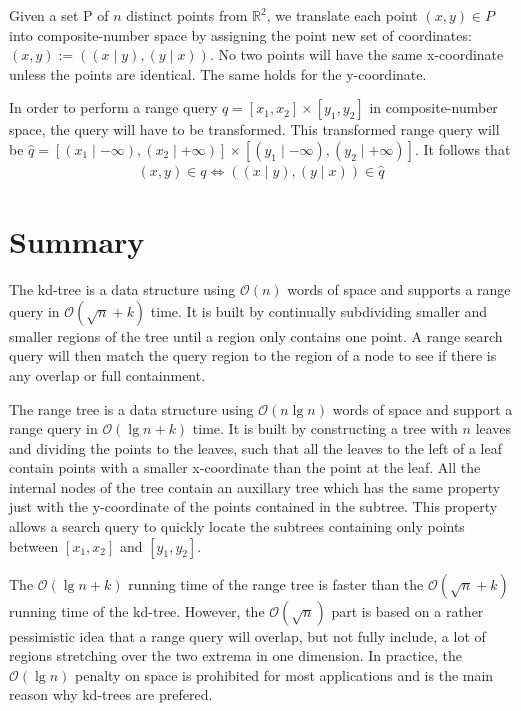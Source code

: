 \noindent Given a set P of $n$ distinct points from $\mathbb{R}^2$, we translate each point $(x,y) \in P$ into composite-number space by assigning the point new set of coordinates: $(x,y) := ( (x \mid y), (y \mid x) )$. No two points will have the same x-coordinate unless the points are identical. The same holds for the y-coordinate.

\noindent In order to perform a range query $q = [x_1, x_2] \times [y_1, y_2]$ in composite-number space, the query will have to be transformed. This transformed range query will be $\hat{q} = [(x_1 \mid -\infty), (x_2 \mid +\infty)] \times [(y_1 \mid -\infty), (y_2 \mid +\infty)]$. It follows that 
\begin{align*}
  (x,y) \in q \iff ( (x \mid y), (y \mid x) ) \in \hat{q}
\end{align*}


\section{Summary}
\label{sect:relsummary}

The kd-tree is a data structure using $\mathcal{O}(n)$ words of space and supports a range query in $\mathcal{O}(\sqrt{n} + k)$ time. It is built by continually subdividing smaller and smaller regions of the tree until a region only contains one point. A range search query will then match the query region to the region of a node to see if there is any overlap or full containment. 

The range tree is a data structure using $\mathcal{O}(n \lg n)$ words of space and support a range query in $\mathcal{O}(\lg n + k)$ time. It is built by constructing a tree with $n$ leaves and dividing the points to the leaves, such that all the leaves to the left of a leaf contain points with a smaller x-coordinate than the point at the leaf. All the internal nodes of the tree contain an auxillary tree which has the same property just with the y-coordinate of the points contained in the subtree. This property allows a search query to quickly locate the subtrees containing only points between $[x_1, x_2]$ and $[y_1, y_2]$.

The $\mathcal{O}(\lg n + k)$ running time of the range tree is faster than the $\mathcal{O}(\sqrt{n} + k)$ running time of the kd-tree. However, the $\mathcal{O}(\sqrt{n})$ part is based on a rather pessimistic idea that a range query will overlap, but not fully include, a lot of regions stretching over the two extrema in one dimension. In practice, the $\mathcal{O}(\lg n)$ penalty on space is prohibited for most applications and is the main reason why kd-trees are prefered.
